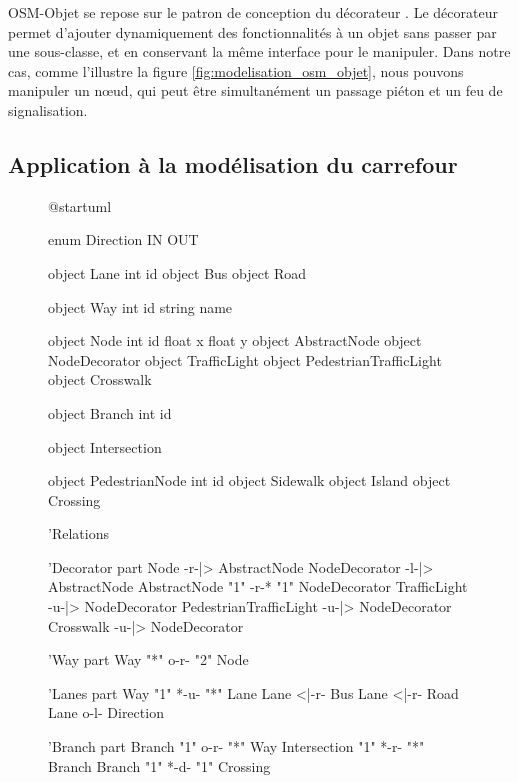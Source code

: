 \newpar{}

OSM-Objet se repose sur le patron de conception du décorateur \cite{Gamma1994a}. Le décorateur permet d'ajouter dynamiquement des fonctionnalités à un objet sans passer par une sous-classe, et en conservant la même interface pour le manipuler. Dans notre cas, comme l'illustre la figure \ref{fig:modelisation_osm_objet}, nous pouvons manipuler un nœud, qui peut être simultanément un passage piéton et un feu de signalisation.

\subsection{Application à la modélisation du carrefour}

\begin{figure}
    \centering
    \begin{plantuml}
        @startuml

        enum Direction {
            IN
            OUT
        }

        object Lane {
            int id
        }
        object Bus
        object Road

        object Way {
            int id
            string name
        }

        object Node {
            int id
            float x
            float y
        }
        object AbstractNode
        object NodeDecorator
        object TrafficLight
        object PedestrianTrafficLight
        object Crosswalk

        object Branch {
            int id
        }

        object Intersection

        object PedestrianNode {
            int id
        }
        object Sidewalk
        object Island
        object Crossing

        'Relations

        'Decorator part
        Node -r-|> AbstractNode
        NodeDecorator -l-|> AbstractNode
        AbstractNode "1" -r-* "1" NodeDecorator
        TrafficLight -u-|> NodeDecorator
        PedestrianTrafficLight -u-|> NodeDecorator
        Crosswalk -u-|> NodeDecorator

        'Way part
        Way "*" o-r- "2" Node

        'Lanes part
        Way "1" *-u- "*" Lane
        Lane <|-r- Bus
        Lane <|-r- Road
        Lane o-l- Direction

        'Branch part
        Branch "1" o-r- "*" Way
        Intersection "1" *-r- "*" Branch
        Branch "1" *-d- "1" Crossing


\end{plantuml}
\end{figure}

